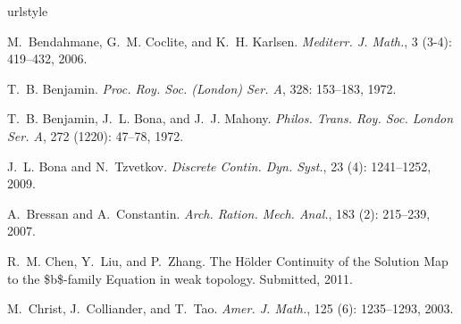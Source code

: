 \documentclass[final,noinfo]{nddiss2e}
\begin{document}
\mainmatter


%

\backmatter              %
\begin{thebibliography}{35}
\providecommand{\natexlab}[1]{#1}
\providecommand{\url}[1]{\texttt{#1}}
\expandafter\ifx\csname urlstyle\endcsname\relax
  \providecommand{\doi}[1]{doi: #1}\else
  \providecommand{\doi}{doi: \begingroup \urlstyle{rm}\Url}\fi

M.~Bendahmane, G.~M. Coclite, and K.~H. Karlsen.
\newblock \emph{Mediterr. J. Math.}, 3 (3-4): 419--432, 2006.

T.~B. Benjamin.
\newblock \emph{Proc. Roy. Soc. (London) Ser. A}, 328: 153--183, 1972.

T.~B. Benjamin, J.~L. Bona, and J.~J. Mahony.
\newblock \emph{Philos. Trans. Roy. Soc. London Ser. A}, 272
  (1220): 47--78, 1972.

J.~L. Bona and N.~Tzvetkov.
\newblock \emph{Discrete Contin. Dyn. Syst.}, 23 (4):
  1241--1252, 2009.

A.~Bressan and A.~Constantin.
\newblock \emph{Arch. Ration. Mech. Anal.}, 183 (2):
  215--239, 2007.

R.~M. Chen, Y.~Liu, and P.~Zhang.
\newblock The H\"{o}lder Continuity of the Solution Map to the \$b\$-family
  Equation in weak topology.
\newblock Submitted, 2011.

M.~Christ, J.~Colliander, and T.~Tao.
\newblock \emph{Amer. J. Math.}, 125 (6): 1235--1293, 2003.


\end{thebibliography}
\end{document}
